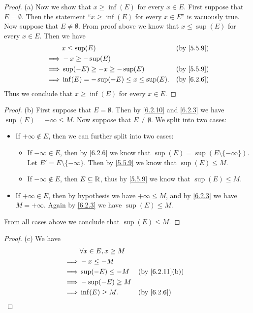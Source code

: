 \begin{proof}{(a)}
  Now we show that \(x \geq \inf(E)\) for every \(x \in E\).
  First suppose that \(E = \emptyset\).
  Then the statement ``\(x \geq \inf(E)\) for every \(x \in E\)'' is vacuously true.
  Now suppose that \(E \neq \emptyset\).
  From proof above we know that \(x \leq \sup(E)\) for every \(x \in E\).
  Then we have
  \begin{align*}
             & x \leq \sup(E)                           &  & \by{5.5.9} \\
    \implies & -x \geq -\sup(E)                                         \\
    \implies & \sup(-E) \geq -x \geq -\sup(E)           &  & \by{5.5.9} \\
    \implies & \inf(E) = -\sup(-E) \leq x \leq \sup(E). &  & \by{6.2.6}
  \end{align*}
  Thus we conclude that \(x \geq \inf(E)\) for every \(x \in E\).
\end{proof}

\begin{proof}{(b)}
  First suppose that \(E = \emptyset\).
  Then by \cref{6.2.10} and \cref{6.2.3} we have \(\sup(E) = -\infty \leq M\).
  Now suppose that \(E \neq \emptyset\).
  We split into two cases:
  \begin{itemize}
    \item If \(+\infty \not\in E\), then we can further split into two cases:
          \begin{itemize}
            \item If \(-\infty \in E\), then by \cref{6.2.6} we know that \(\sup(E) = \sup(E \setminus \{-\infty\})\).
                  Let \(E' = E \setminus \{-\infty\}\).
                  Then by \cref{5.5.9} we know that \(\sup(E) \leq M\).
            \item If \(-\infty \notin E\), then \(E \subseteq \mathbb{R}\), thus by \cref{5.5.9} we know that \(\sup(E) \leq M\).
          \end{itemize}
    \item If \(+\infty \in E\), then by hypothesis we have \(+\infty \leq M\), and by \cref{6.2.3} we have \(M = +\infty\).
          Again by \cref{6.2.3} we have \(\sup(E) \leq M\).
  \end{itemize}
  From all cases above we conclude that \(\sup(E) \leq M\).
\end{proof}

\begin{proof}{(c)}
  We have
  \begin{align*}
             & \forall x \in E, x \geq M                                   \\
    \implies & -x \leq -M                                                  \\
    \implies & \sup(-E) \leq -M          &  & \text{(by \cref{6.2.11}(b))} \\
    \implies & -\sup(-E) \geq M                                            \\
    \implies & \inf(E) \geq M.           &  & \by{6.2.6}
  \end{align*}
\end{proof}


